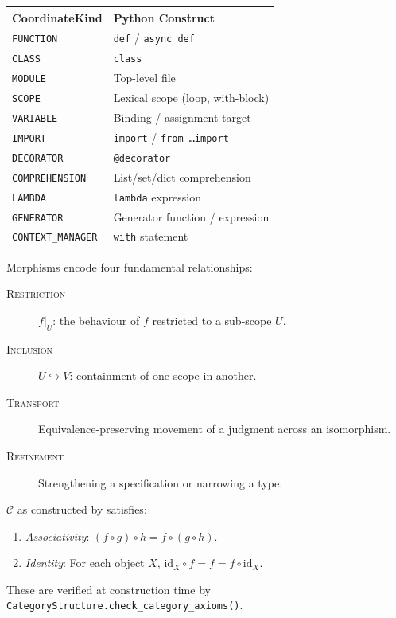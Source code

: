 \begin{center}
\begin{tabular}{ll}
\toprule
\textbf{CoordinateKind} & \textbf{Python Construct} \\
\midrule
\texttt{FUNCTION} & \texttt{def} / \texttt{async def} \\
\texttt{CLASS} & \texttt{class} \\
\texttt{MODULE} & Top-level file \\
\texttt{SCOPE} & Lexical scope (loop, with-block) \\
\texttt{VARIABLE} & Binding / assignment target \\
\texttt{IMPORT} & \texttt{import} / \texttt{from \ldots import} \\
\texttt{DECORATOR} & \texttt{@decorator} \\
\texttt{COMPREHENSION} & List/set/dict comprehension \\
\texttt{LAMBDA} & \texttt{lambda} expression \\
\texttt{GENERATOR} & Generator function / expression \\
\texttt{CONTEXT\_MANAGER} & \texttt{with} statement \\
\bottomrule
\end{tabular}
\end{center}

Morphisms encode four fundamental relationships:
\begin{description}
  \item[\textsc{Restriction}] $f|_U$: the behaviour of $f$ restricted to
        a sub-scope $U$.
  \item[\textsc{Inclusion}] $U \hookrightarrow V$: containment of one scope
        in another.
  \item[\textsc{Transport}] Equivalence-preserving movement of a judgment
        across an isomorphism.
  \item[\textsc{Refinement}] Strengthening a specification or narrowing a type.
\end{description}

\begin{proposition}\label{prop:category}
$\mathcal{C}$ as constructed by \JuGeo{} satisfies:
\begin{enumerate}
  \item \emph{Associativity}: $(f \circ g) \circ h = f \circ (g \circ h)$.
  \item \emph{Identity}: For each object $X$, $\mathrm{id}_X \circ f = f = f \circ \mathrm{id}_X$.
\end{enumerate}
These are verified at construction time by \texttt{CategoryStructure.check\_category\_axioms()}.
\end{proposition}

